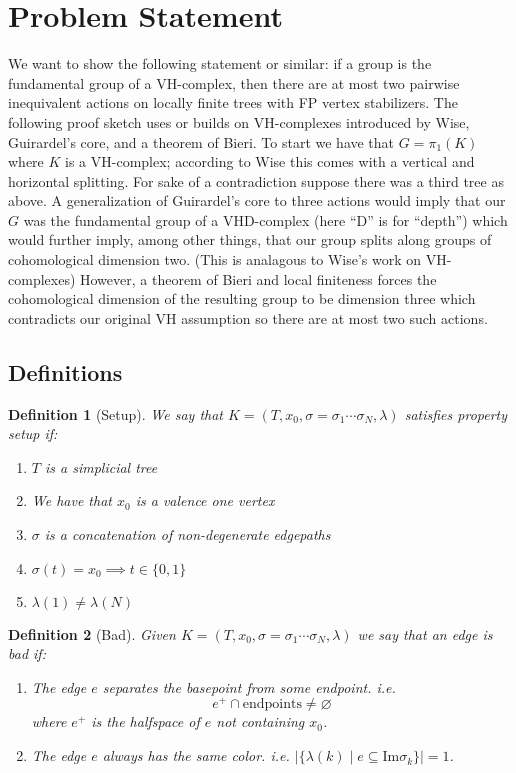 \documentclass{article}
\theoremstyle{mystyle}
\newtheorem{defn}{Definition}
\theoremstyle{remark}
\begin{document}
\section{Problem Statement}
We want to show the following statement or similar: if a group is the fundamental group of a VH-complex, then there are at most two pairwise inequivalent actions on locally finite trees with FP vertex stabilizers. The following proof sketch uses or builds on VH-complexes introduced by Wise, Guirardel's core, and a theorem of Bieri. To start we have that \(G = \pi_1(K)\) where \(K\) is a VH-complex; according to Wise this comes with a vertical and horizontal splitting. For sake of a contradiction suppose there was a third tree as above. A generalization of Guirardel's core to three actions would imply that our \(G\) was the fundamental group of a VHD-complex (here ``D'' is for ``depth'') which would further imply, among other things, that our group splits along groups of cohomological dimension two. (This is analagous to Wise's work on VH-complexes) However, a theorem of Bieri and local finiteness forces the cohomological dimension of the resulting group to be dimension three which contradicts our original VH assumption so there are at most two such actions.

\subsection{Definitions}

\begin{defn}
    [Setup]
    \label{def:setup} 
    We say that \(K = (T, x_{0},\sigma=\sigma_{1}\cdots\sigma_{N},\lambda)\) satisfies property {\em setup} if:
    \begin{enumerate}
        \item \(T\) is a simplicial tree
        \item We have that \(x_{0}\) is a valence one vertex
        \item \(\sigma\) is a concatenation of non-degenerate edgepaths
        \item \(\sigma (t)=x_{0} \implies t \in \{0,1\}\) 
        \item \(\lambda (1) \neq \lambda (N)\) 
    \end{enumerate}
\end{defn}


\begin{defn}
    [Bad]
    Given \(K = (T, x_{0},\sigma=\sigma_{1}\cdots\sigma_{N},\lambda)\) we say that an edge is {\em bad} if:
    \begin{enumerate}
        \item The edge \(e\) separates the basepoint from some endpoint. i.e. \[e^{+} \cap \text{endpoints} \neq \varnothing\] where \(e^{+}\) is the halfspace of \(e\) not containing \(x_{0}\).
        \item The edge \(e\) always has the same color. i.e. \(\left| \{\lambda (k) \mid e \subseteq \text{Im} \sigma_{k}\} \right|=1\).
    \end{enumerate}
\end{defn}
\end{document}
